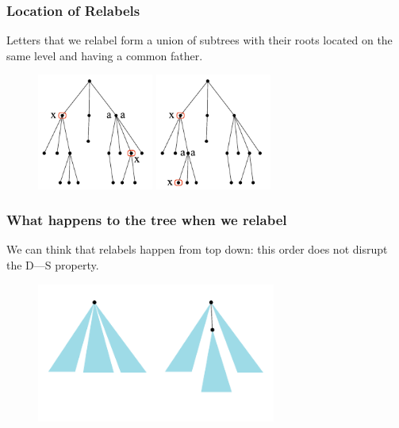 \documentclass[aspectratio=1610,12pt,notheorems]{beamer}
\begin{document}
\begin{frame} \frametitle{Location of Relabels}
\begin{block}{\vspace*{-3ex}}
	Letters that we relabel form a union of subtrees with their roots located on the same level and having a common father.
\end{block}

\begin{figure} \centering
	\includegraphics[width=0.34\textwidth]{algolunch/sametree} \hspace{1.5cm}
	\includegraphics[width=0.34\textwidth]{algolunch/samelevel}
\end{figure}
\end{frame}

\begin{frame} \frametitle{What happens to the tree when we relabel} \vspace{1cm}

	We can think that relabels happen from top down: this order does not disrupt the D—S property.

\begin{figure} \centering
	\includegraphics[width=0.7\textwidth]{algolunch/firstpush}
\end{figure}
\end{frame}
\end{document}
